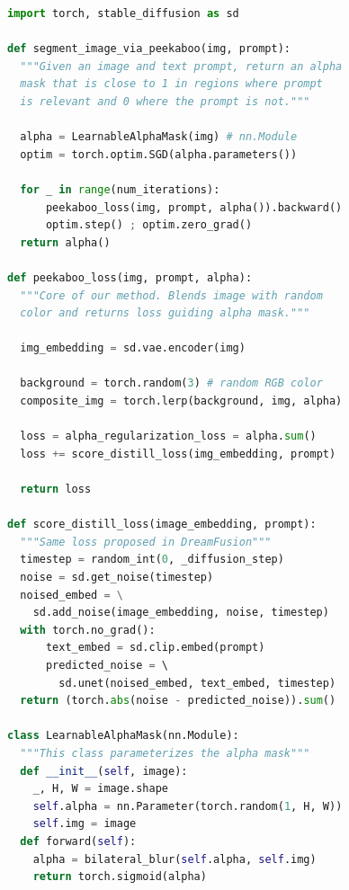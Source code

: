 \begin{algorithm}[t]

\caption{Pytorch style pseudocode for Peekaboo}
\label{peekaboo_alg:peekaboo}



\begin{lstlisting}[language=python] 
import torch, stable_diffusion as sd

def segment_image_via_peekaboo(img, prompt):
  """Given an image and text prompt, return an alpha 
  mask that is close to 1 in regions where prompt 
  is relevant and 0 where the prompt is not."""
  
  alpha = LearnableAlphaMask(img) # nn.Module 
  optim = torch.optim.SGD(alpha.parameters())
  
  for _ in range(num_iterations):
      peekaboo_loss(img, prompt, alpha()).backward()
      optim.step() ; optim.zero_grad()
  return alpha()

def peekaboo_loss(img, prompt, alpha):
  """Core of our method. Blends image with random
  color and returns loss guiding alpha mask."""
  
  img_embedding = sd.vae.encoder(img)
  
  background = torch.random(3) # random RGB color
  composite_img = torch.lerp(background, img, alpha)
  
  loss = alpha_regularization_loss = alpha.sum()
  loss += score_distill_loss(img_embedding, prompt)
  
  return loss

def score_distill_loss(image_embedding, prompt):
  """Same loss proposed in DreamFusion"""
  timestep = random_int(0, _diffusion_step)
  noise = sd.get_noise(timestep)
  noised_embed = \
    sd.add_noise(image_embedding, noise, timestep)  
  with torch.no_grad():
      text_embed = sd.clip.embed(prompt)    
      predicted_noise = \ 
        sd.unet(noised_embed, text_embed, timestep)  
  return (torch.abs(noise - predicted_noise)).sum()

class LearnableAlphaMask(nn.Module):
  """This class parameterizes the alpha mask"""
  def __init__(self, image):
    _, H, W = image.shape
    self.alpha = nn.Parameter(torch.random(1, H, W))
    self.img = image
  def forward(self):
    alpha = bilateral_blur(self.alpha, self.img)
    return torch.sigmoid(alpha)
\end{lstlisting}
\end{algorithm}

